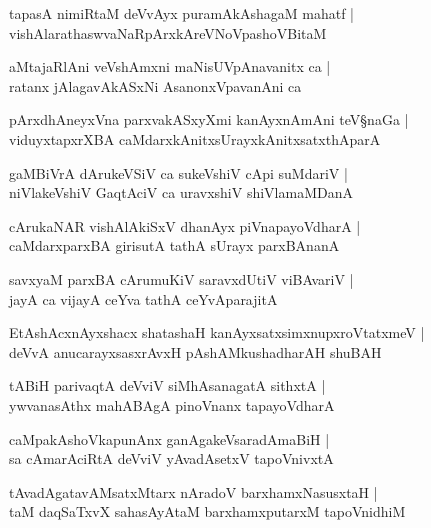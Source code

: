 \begin{shloka}
tapasA nimiRtaM deVvAyx puramAkAshagaM mahatf |\\
vishAlarathaswvaNaRpArxkAreVNoVpashoVBitaM 
\end{shloka}

\begin{shloka}
aMtajaRlAni veVshAmxni maNisUVpAnavanitx ca |\\
ratanx jAlagavAkASxNi AsanonxVpavanAni ca
\end{shloka}

\begin{shloka}
pArxdhAneyxVna parxvakASxyXmi kanAyxnAmAni teV\S naGa |\\
viduyxtapxrXBA caMdarxkAnitxsUrayxkAnitxsatxthAparA
\end{shloka}

\begin{shloka}
gaMBiVrA dArukeVSiV ca sukeVshiV cApi suMdariV |\\
niVlakeVshiV GaqtAciV ca uravxshiV shiVlamaMDanA
\end{shloka}

\begin{shloka}
cArukaNAR vishAlAkiSxV dhanAyx piVnapayoVdharA |\\
caMdarxparxBA girisutA tathA sUrayx parxBAnanA 
\end{shloka}

\begin{shloka}
savxyaM parxBA cArumuKiV saravxdUtiV viBAvariV |\\
jayA ca vijayA ceYva tathA ceYvAparajitA
\end{shloka}

\begin{shloka}
EtAshAcxnAyxshacx shatashaH kanAyxsatxsimxnupxroVtatxmeV |\\
deVvA anucarayxsasxrAvxH pAshAMkushadharAH shuBAH
\end{shloka}

\begin{shloka}
tABiH parivaqtA deVviV siMhAsanagatA sithxtA |\\
ywvanasAthx mahABAgA pinoVnanx tapayoVdharA 
\end{shloka}

\begin{shloka}
caMpakAshoVkapunAnx ganAgakeVsaradAmaBiH |\\
sa cAmarAciRtA deVviV yAvadAsetxV tapoVnivxtA 
\end{shloka}

\begin{shloka}
tAvadAgatavAMsatxMtarx nAradoV barxhamxNasusxtaH |\\
taM daqSaTxvX sahasAyAtaM barxhamxputarxM tapoVnidhiM 
\end{shloka}

